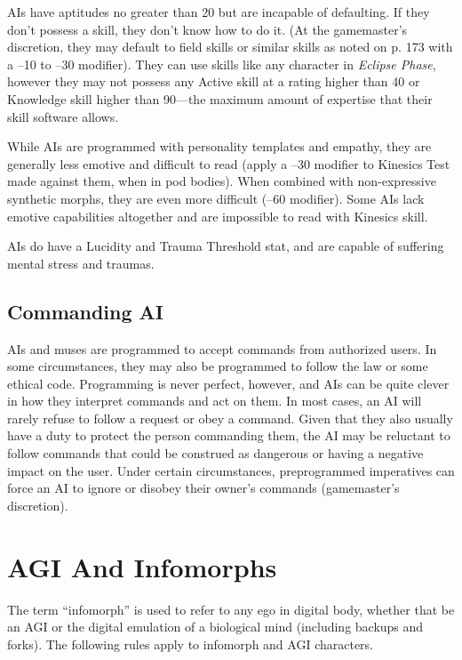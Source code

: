 AIs have aptitudes no greater than 20 but are incapable of defaulting. If they don't possess a skill, they don't know how to do it. (At the gamemaster's discretion, they may default to field skills or similar skills as noted on p. 173 with a –10 to –30 modifier). They can use skills like any character in \textit{Eclipse Phase}, however they may not possess any Active skill at a rating higher than 40 or Knowledge skill higher than 90—the maximum amount of expertise that their skill software allows. 

While AIs are programmed with personality templates and empathy, they are generally less emotive and difficult to read (apply a –30 modifier to Kinesics Test made against them, when in pod bodies). When combined with non-expressive synthetic morphs, they are even more difficult (–60 modifier). Some AIs lack emotive capabilities altogether and are impossible to read with Kinesics skill. 

AIs do have a Lucidity and Trauma Threshold stat, and are capable of suffering mental stress and traumas. 

\subsection{Commanding AI} 

AIs and muses are programmed to accept commands from authorized users. In some circumstances, they may also be programmed to follow the law or some ethical code. Programming is never perfect, however, and AIs can be quite clever in how they interpret commands and act on them. In most cases, an AI will rarely refuse to follow a request or obey a command. Given that they also usually have a duty to protect the person commanding them, the AI may be reluctant to follow commands that could be construed as dangerous or having a negative impact on the user. Under certain circumstances, preprogrammed imperatives can force an AI to ignore or disobey their owner's commands (gamemaster's discretion). 

\section{AGI And Infomorphs} 

The term ``infomorph'' is used to refer to any ego in digital body, whether that be an AGI or the digital emulation of a biological mind (including backups and forks). The following rules apply to infomorph and AGI characters. 



